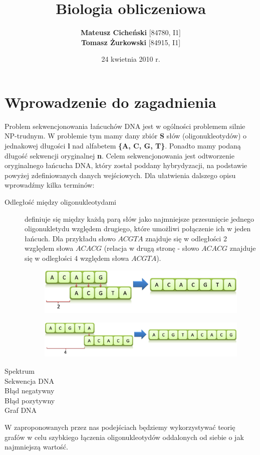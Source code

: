 \documentclass[a4paper,10pt]{article}
\title{\textbf{Biologia obliczeniowa}}
\author{\textbf{Mateusz Cicheński} [84780, I1]\\ \textbf{Tomasz Żurkowski} [84915, I1]}
\date{24 kwietnia 2010 r.}
\begin{document}
 
\maketitle

\tableofcontents

\newpage

\section{Wprowadzenie do zagadnienia}

Problem sekwencjonowania łańcuchów DNA jest w ogólności problemem silnie NP-trudnym. W problemie tym mamy dany zbiór {\bf S} słów (oligonukleotydów) o jednakowej długości {\bf l} nad alfabetem {\bf \{A, C, G, T\}}. Ponadto mamy podaną długość sekwencji oryginalnej {\bf n}. Celem sekwencjonowania jest odtworzenie oryginalnego łańcucha DNA, który został poddany hybrydyzacji, na podstawie powyżej zdefiniowanych danych wejściowych.
Dla ułatwienia dalszego opisu wprowadźmy kilka terminów: 
\begin{description}
  \item[Odległość między oligonukleotydami] definiuje się między każdą parą słów jako najmniejsze przesunięcie jednego oligonukletydu względem drugiego, które umożliwi połączenie ich w jeden łańcuch. Dla przykładu słowo $ACGTA$ znajduje się w odległości 2 względem słowa $ACACG$ (relacja w drugą stronę - słowo $ACACG$ znajduje się w odległości 4 względem słowa $ACGTA$).

\begin{figure}[h]
  \footnotesize\centering
  \includegraphics[width=\textwidth,keepaspectratio]{Distance1.png}
\end{figure}

\begin{figure}[h]
  \footnotesize\centering
  \includegraphics[width=\textwidth,keepaspectratio]{Distance2.png}
\end{figure}

  \item[Spektrum] %
  \item[Sekwencja DNA] %
  \item[Błąd negatywny]
  \item[Błąd pozytywny] 
  \item[Graf DNA]
\end{description}
W zaproponowanych przez nas podejściach będziemy wykorzystywać teorię grafów w celu szybkiego łączenia oligonukleotydów oddalonych od siebie o jak najmniejszą wartość.
\end{document}
